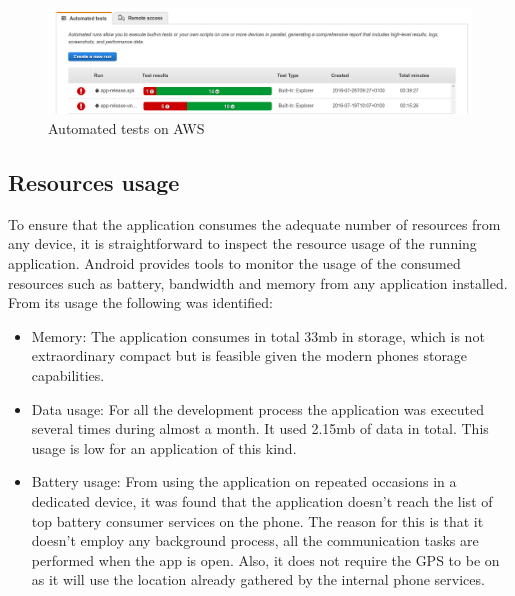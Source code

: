 \begin{figure}[H]
\begin{adjustbox}{width=1\textwidth,center=\textwidth}
  \centering
  \includegraphics[scale=1]{images/automated_tests.png}
\end{adjustbox}
  \caption[Automated tests on AWS]{Automated tests on AWS}
  \label{fig:automated_tests}
\end{figure}

\subsection{Resources usage}
To ensure that the application consumes the adequate number of resources from any device, it is straightforward to inspect the resource usage of the running application. Android provides tools to monitor the usage of the consumed resources such as battery, bandwidth and memory from any application installed. From its usage the following was identified:
\begin{itemize}
    \item Memory: The application consumes in total 33mb in storage, which is not extraordinary compact but is feasible given the modern phones storage capabilities.
    \item Data usage: For all the development process the application was executed several times during almost a month. It used 2.15mb of data in total. This usage is low for an application of this kind.
    \item Battery usage: From using the application on repeated occasions in a dedicated device, it was found that the application doesn't reach the list of top battery consumer services on the phone. The reason for this is that it doesn't employ any background process, all the communication tasks are performed when the app is open. Also, it does not require the GPS to be on as it will use the location already gathered by the internal phone services.
\end{itemize}


